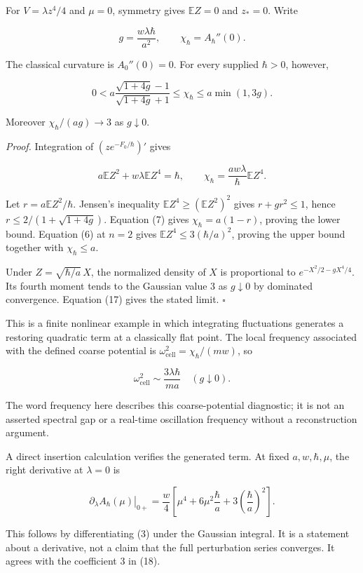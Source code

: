 \documentclass[11pt,a4paper]{article}
\begin{document}
For \(V=\lambda z^4/4\) and \(\mu=0\), symmetry gives \(\mathbb EZ=0\)
and \(z_*=0\). Write

\[g=\frac{w\lambda\hbar}{a^2},\qquad
 \chi_\hbar=A_\hbar''(0).\tag{15}\]

The classical curvature is \(A_0''(0)=0\). For every supplied
\(\hbar>0\), however,

\[
 0<a\frac{\sqrt{1+4g}-1}{\sqrt{1+4g}+1}
       \le\chi_\hbar\le a\min(1,3g).
 \tag{16}
\]

Moreover \(\chi_\hbar/(ag)\to3\) as \(g\downarrow0\).

\emph{Proof.} Integration of \((ze^{-F_0/\hbar})'\) gives

\[a\mathbb EZ^2+w\lambda\mathbb EZ^4=\hbar,\qquad
 \chi_\hbar=\frac{aw\lambda}{\hbar}\mathbb EZ^4.\tag{17}\]

Let \(r=a\mathbb EZ^2/\hbar\). Jensen's inequality
\(\mathbb EZ^4\ge(\mathbb EZ^2)^2\) gives \(r+gr^2\le1\), hence
\(r\le2/(1+\sqrt{1+4g})\). Equation (7) gives \(\chi_\hbar=a(1-r)\),
proving the lower bound. Equation (6) at \(n=2\) gives
\(\mathbb EZ^4\le3(\hbar/a)^2\), proving the upper bound together with
\(\chi_\hbar\le a\).

Under \(Z=\sqrt{\hbar/a}\,X\), the normalized density of \(X\) is
proportional to \(e^{-X^2/2-gX^4/4}\). Its fourth moment tends to the
Gaussian value 3 as \(g\downarrow0\) by dominated convergence. Equation
(17) gives the stated limit. \(\square\)

This is a finite nonlinear example in which integrating fluctuations
generates a restoring quadratic term at a classically flat point. The
local frequency associated with the defined coarse potential is
\(\omega_{\mathrm{cell}}^2=\chi_\hbar/(mw)\), so

\[
 \omega_{\mathrm{cell}}^2
       \sim\frac{3\lambda\hbar}{ma}\quad(g\downarrow0).
 \tag{18}
\]

The word frequency here describes this coarse-potential diagnostic; it
is not an asserted spectral gap or a real-time oscillation frequency
without a reconstruction argument.

A direct insertion calculation verifies the generated term. At fixed
\(a,w,\hbar,\mu\), the right derivative at \(\lambda=0\) is

\[
 \left.\partial_\lambda A_\hbar(\mu)\right|_{0+}
 =\frac w4\left[\mu^4+6\mu^2\frac\hbar a
                         +3\left(\frac\hbar a\right)^2\right].
 \tag{19}
\]

This follows by differentiating (3) under the Gaussian integral. It is a
statement about a derivative, not a claim that the full perturbation
series converges. It agrees with the coefficient 3 in (18).
\end{document}
